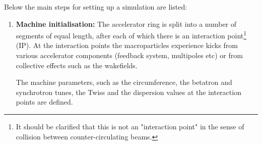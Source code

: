 {Below the main steps for setting up a simulation are listed: %


\begin{enumerate}
    \item \textbf{Machine initialisation:} The accelerator ring is split into a number of segments of equal length, after each of which there is an interaction point\footnote{It should be clarified that this is not an "interaction point" in the sense of collision between counter-circulating beams.} (IP). At the interaction points the macroparticles experience kicks from various accelerator components (feedback system, multipoles etc) or from collective effects such as the wakefields. 
    
    The machine parameters, such as the circumference, the betatron and synchrotron tunes, the Twiss and the dispersion values at the interaction points are defined. %
    

\end{enumerate}}
